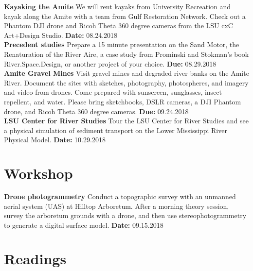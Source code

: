 \documentclass[11pt,article,oneside]{memoir}
\begin{document}
\noindent \textbf{Kayaking the Amite}
We will rent kayaks from University Recreation
and kayak along the Amite 
with a team from Gulf Restoration Network. 
Check out a Phantom DJI drone
and Ricoh Theta 360 degree cameras from the
LSU cxC Art+Design Studio. 
\textbf{Date:} 08.24.2018 \\

\noindent \textbf{Precedent studies}
Prepare a 15 minute presentation on 
the Sand Motor, 
the Renaturation of the River Aire, 
a case study from Prominski and Stokman's book River.Space.Design,
or another project of your choice. 
\textbf{Due:} 08.29.2018 \\

\noindent \textbf{Amite Gravel Mines}
Visit gravel mines and degraded river banks on the Amite River.
Document the sites with sketches, photography, photospheres, and
imagery and video from drones.
Come prepared with sunscreen, sunglasses, insect repellent, and water.
Please bring sketchbooks, DSLR cameras,
a DJI Phantom drone, and Ricoh Theta 360 degree cameras.
\textbf{Due:} 09.24.2018 \\

\noindent \textbf{LSU Center for River Studies}
Tour the LSU Center for River Studies
and see a physical simulation of sediment transport on
the Lower Mississippi River Physical Model.
\textbf{Date:} 10.29.2018\\

\section{Workshop}
\noindent \textbf{Drone photogrammetry}
Conduct a topographic survey with an unmanned aerial system (UAS)
at Hilltop Arboretum. 
After a morning theory session, 
survey the arboretum grounds with a drone,
and then use stereophotogrammetry to generate a digital surface model.
\textbf{Date:} 09.15.2018 \\


\clearpage

\section{Readings}
\renewcommand*{\bibfont}{\normalsize} %
\vspace*{0.5cm}
\nocite{*}
\setlength{}
\printbibliography[heading=none]
\end{document}
